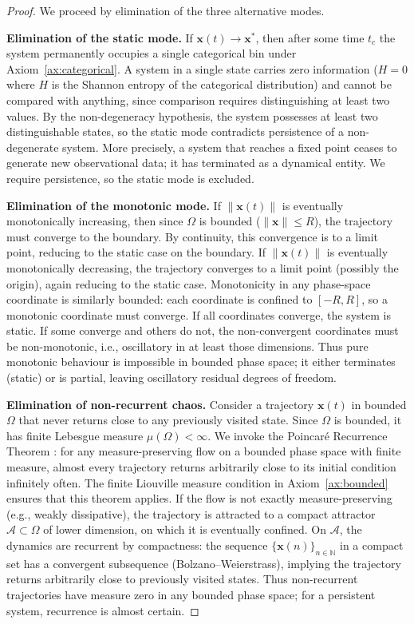 \documentclass[11pt,twocolumn,a4paper]{article}
\newcommand{\N}{\mathbb{N}}
\begin{document}
\begin{proof}
We proceed by elimination of the three alternative modes.

\textbf{Elimination of the static mode.}
If $\mathbf{x}(t) \to \mathbf{x}^*$, then after some time $t_c$ the
system permanently occupies a single categorical bin under
Axiom~\ref{ax:categorical}. A system in a single state carries zero
information ($H = 0$ where $H$ is the Shannon entropy
\citep{shannon1948} of the categorical distribution) and cannot be
compared with anything, since comparison requires distinguishing at
least two values. By the non-degeneracy hypothesis, the system possesses
at least two distinguishable states, so the static mode contradicts
persistence of a non-degenerate system. More precisely, a system that
reaches a fixed point ceases to generate new observational data; it has
terminated as a dynamical entity. We require persistence, so the static
mode is excluded.

\textbf{Elimination of the monotonic mode.}
If $\|\mathbf{x}(t)\|$ is eventually monotonically increasing, then
since $\Omega$ is bounded ($\|\mathbf{x}\| \leq R$), the trajectory
must converge to the boundary. By continuity, this convergence is to a
limit point, reducing to the static case on the boundary. If
$\|\mathbf{x}(t)\|$ is eventually monotonically decreasing, the
trajectory converges to a limit point (possibly the origin), again
reducing to the static case. Monotonicity in any phase-space coordinate
is similarly bounded: each coordinate is confined to $[-R, R]$, so a
monotonic coordinate must converge. If all coordinates converge, the
system is static. If some converge and others do not, the
non-convergent coordinates must be non-monotonic, i.e., oscillatory in
at least those dimensions. Thus pure monotonic behaviour is impossible
in bounded phase space; it either terminates (static) or is partial,
leaving oscillatory residual degrees of freedom.

\textbf{Elimination of non-recurrent chaos.}
Consider a trajectory $\mathbf{x}(t)$ in bounded $\Omega$ that never
returns close to any previously visited state. Since $\Omega$ is bounded,
it has finite Lebesgue measure $\mu(\Omega) < \infty$. We invoke the
Poincar\'{e} Recurrence Theorem \citep{poincare1890}: for any
measure-preserving flow on a bounded phase space with finite measure,
almost every trajectory returns arbitrarily close to its initial
condition infinitely often. The finite Liouville measure condition in
Axiom~\ref{ax:bounded} ensures that this theorem applies. If the flow is
not exactly measure-preserving (e.g., weakly dissipative), the trajectory
is attracted to a compact attractor $\mathcal{A} \subset \Omega$ of
lower dimension, on which it is eventually confined. On $\mathcal{A}$,
the dynamics are recurrent by compactness: the sequence
$\{\mathbf{x}(n)\}_{n \in \N}$ in a compact set has a convergent
subsequence (Bolzano--Weierstrass), implying the trajectory returns
arbitrarily close to previously visited states. Thus non-recurrent
trajectories have measure zero in any bounded phase space; for a
persistent system, recurrence is almost certain.


\end{proof}
\end{document}
